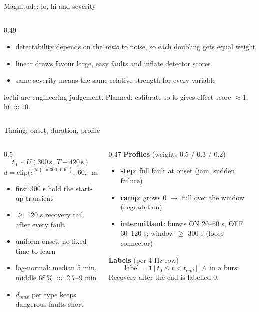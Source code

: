 \documentclass[aspectratio=169,11pt]{beamer}
\newcommand{\aside}[1]{{\color{muted}\small #1}}
\begin{document}
\begin{frame}{Magnitude: lo, hi and severity}
\begin{columns}[T]
\begin{column}{0.49\textwidth}
      \begin{itemize}\footnotesize
        \item detectability depends on the \emph{ratio} to noise, so each doubling gets equal weight
        \item linear draws favour large, easy faults and inflate detector scores
        \item same severity means the same relative strength for every variable
      \end{itemize}
      {\color{muted}\scriptsize lo/hi are engineering judgement. Planned: calibrate so lo gives effect score $\approx$1, hi $\approx$10.}
    \end{column}
  \end{columns}
\end{frame}

\begin{frame}{Timing: onset, duration, profile}
  \begin{columns}[T]
    \begin{column}{0.5\textwidth}
      \[ t_0 \sim U(300\,\mathrm{s},\ T - 420\,\mathrm{s}) \]
      \[ d = \mathrm{clip}\big(e^{\mathcal N(\ln 300,\,0.6^2)},\ 60,\ \min(d_{max}, T-120-t_0)\big) \]
      \small
      \begin{itemize}
        \item first 300 s hold the start-up transient
        \item $\geq$ 120 s recovery tail after every fault
        \item uniform onset: no fixed time to learn
        \item log-normal: median 5 min, middle 68\,\% $\approx$ 2.7--9 min
        \item $d_{max}$ per type keeps dangerous faults short
      \end{itemize}
    \end{column}
    \begin{column}{0.47\textwidth}
      \textbf{Profiles} \aside{(weights 0.5 / 0.3 / 0.2)}
      \begin{itemize}\small\setlength\itemsep{0.4em}
        \item \textbf{step}: full fault at onset (jam, sudden failure)
        \item \textbf{ramp}: grows 0 $\rightarrow$ full over the window (degradation)
        \item \textbf{intermittent}: bursts ON 20--60 s, OFF 30--120 s; window $\geq$ 300 s (loose connector)
      \end{itemize}
      \vspace{0.4em}
      \textbf{Labels} (per 4 Hz row)
      \[ \mathrm{label} = \mathbf 1[t_0 \le t < t_{end}] \ \wedge\ \text{in a burst} \]
      \aside{Recovery after the end is labelled 0.}
    \end{column}
  \end{columns}
\end{frame}
\end{document}
